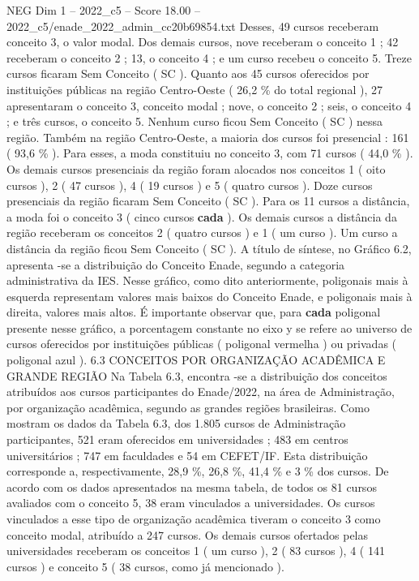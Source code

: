 \begin{textsample}{NEG Dim 1 – 2022\_c5 – Score 18.00 – 2022\_c5/enade\_2022\_admin\_cc20b69854.txt}
Desses, 49 cursos receberam conceito 3, o valor modal.
Dos demais cursos, nove receberam o conceito 1 ; 42 receberam o conceito 2 ; 13, o conceito 4 ; e um curso recebeu o conceito 5.
Treze cursos ficaram Sem Conceito ( SC ).
Quanto aos 45 cursos oferecidos por instituições públicas na região Centro-Oeste ( 26,2 \% do total regional ), 27 apresentaram o conceito 3, conceito modal ; nove, o conceito 2 ; seis, o conceito 4 ; e três cursos, o conceito 5.
Nenhum curso ficou Sem Conceito ( SC ) nessa região.
Também na região Centro-Oeste, a maioria dos cursos foi presencial : 161 ( 93,6 \% ).
Para esses, a moda constituiu no conceito 3, com 71 cursos ( 44,0 \% ).
Os demais cursos presenciais da região foram alocados nos conceitos 1 ( oito cursos ), 2 ( 47 cursos ), 4 ( 19 cursos ) e 5 ( quatro cursos ).
Doze cursos presenciais da região ficaram Sem Conceito ( SC ).
Para os 11 cursos a distância, a moda foi o conceito 3 ( cinco cursos \textbf{cada} ).
Os demais cursos a distância da região receberam os conceitos 2 ( quatro cursos ) e 1 ( um curso ).
Um curso a distância da região ficou Sem Conceito ( SC ).
A título de síntese, no Gráfico 6.2, apresenta -se a distribuição do Conceito Enade, segundo a categoria administrativa da IES.
Nesse gráfico, como dito anteriormente, poligonais mais à esquerda representam valores mais baixos do Conceito Enade, e poligonais mais à direita, valores mais altos.
É importante observar que, para \textbf{cada} poligonal presente nesse gráfico, a porcentagem constante no eixo y se refere ao universo de cursos oferecidos por instituições públicas ( poligonal vermelha ) ou privadas ( poligonal azul ). 6.3 CONCEITOS POR ORGANIZAÇÃO ACADÊMICA E GRANDE REGIÃO Na Tabela 6.3, encontra -se a distribuição dos conceitos atribuídos aos cursos participantes do Enade/2022, na área de Administração, por organização acadêmica, segundo as grandes regiões brasileiras.
Como mostram os dados da Tabela 6.3, dos 1.805 cursos de Administração participantes, 521 eram oferecidos em universidades ; 483 em centros universitários ; 747 em faculdades e 54 em CEFET/IF.
Esta distribuição corresponde a, respectivamente, 28,9 \%, 26,8 \%, 41,4 \% e 3 \% dos cursos.
De acordo com os dados apresentados na mesma tabela, de todos os 81 cursos avaliados com o conceito 5, 38 eram vinculados a universidades.
Os cursos vinculados a esse tipo de organização acadêmica tiveram o conceito 3 como conceito modal, atribuído a 247 cursos.
Os demais cursos ofertados pelas universidades receberam os conceitos 1 ( um curso ), 2 ( 83 cursos ), 4 ( 141 cursos ) e conceito 5 ( 38 cursos, como já mencionado ).

\end{textsample}
